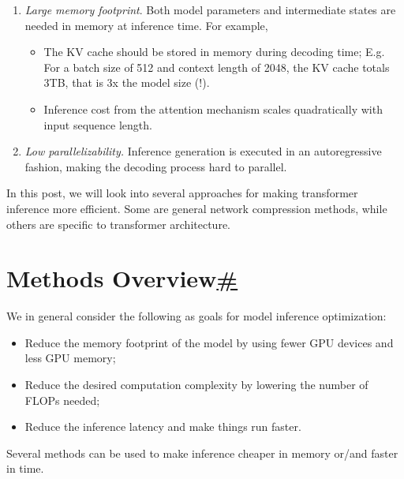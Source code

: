 \begin{enumerate}
\tightlist
\item
  \emph{Large memory footprint}. Both model parameters and intermediate states are needed in memory at inference time. For example,

  \begin{itemize}
  \tightlist
  \item
    The KV cache should be stored in memory during decoding time; E.g. For a batch size of 512 and context length of 2048, the KV cache totals 3TB, that is 3x the model size (!).
  \item
    Inference cost from the attention mechanism scales quadratically with input sequence length.
  \end{itemize}
\item
  \emph{Low parallelizability.} Inference generation is executed in an autoregressive fashion, making the decoding process hard to parallel.
\end{enumerate}

In this post, we will look into several approaches for making transformer inference more efficient. Some are general network compression methods, while others are specific to transformer architecture.

\section{\texorpdfstring{Methods Overview\hyperref[methods-overview]{\#}}{Methods Overview\#}}\label{methods-overview}

We in general consider the following as goals for model inference optimization:

\begin{itemize}
\tightlist
\item
  Reduce the memory footprint of the model by using fewer GPU devices and less GPU memory;
\item
  Reduce the desired computation complexity by lowering the number of FLOPs needed;
\item
  Reduce the inference latency and make things run faster.
\end{itemize}

Several methods can be used to make inference cheaper in memory or/and faster in time.


